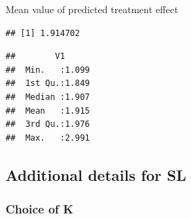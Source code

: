 \documentclass[
]{book}
\newenvironment{Shaded}{\begin{snugshade}}{\end{snugshade}}
\newcommand{\FunctionTok}[1]{\textcolor[rgb]{0.00,0.00,0.00}{#1}}
\newcommand{\NormalTok}[1]{#1}
\newcommand{\OtherTok}[1]{\textcolor[rgb]{0.56,0.35,0.01}{#1}}
\newcommand{\SpecialCharTok}[1]{\textcolor[rgb]{0.00,0.00,0.00}{#1}}
\begin{document}
\begin{Shaded}
\end{Shaded}

Mean value of predicted treatment effect

\begin{Shaded}
\end{Shaded}

\begin{verbatim}
## [1] 1.914702
\end{verbatim}

\begin{Shaded}
\end{Shaded}

\begin{verbatim}
##        V1       
##  Min.   :1.099  
##  1st Qu.:1.849  
##  Median :1.907  
##  Mean   :1.915  
##  3rd Qu.:1.976  
##  Max.   :2.991
\end{verbatim}

\hypertarget{additional-details-for-sl}{%
\subsection{Additional details for SL}\label{additional-details-for-sl}}

\hypertarget{choice-of-k}{%
\subsubsection{Choice of K}\label{choice-of-k}}
\end{document}
